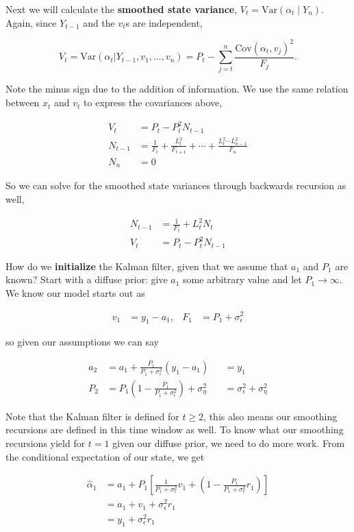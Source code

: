 \documentclass{tufte-book}
\begin{document}
Next we will calculate the \textbf{smoothed state variance}, $V_t = \text{Var}(\alpha_t \mid Y_n)$. Again, since $Y_{t-1}$ and the $v_t$s are independent, 

\[
V_t = \text{Var}(\alpha_t | Y_{t-1}, v_1, ..., v_n) = P_t - \sum_{j=t}^n \frac{\text{Cov}(\alpha_t, v_j)^2}{F_j}.
\]

\noindent Note the minus sign due to the addition of information. We use the same relation between $x_t$ and $v_t$ to express the covariances above,

\begin{align*}
V_t &= P_t - P_t^2 N_{t-1} \\
N_{t-1} &= \frac{1}{F_t} + \frac{L_t^2}{F_{t+1}} + \cdots + \frac{L_t^2 \cdots L_{n-1}^2}{F_n} \\
N_n &= 0
\end{align*}

So we can solve for the smoothed state variances through backwards recursion as well,

\begin{align*}
N_{t-1} &= \frac{1}{F_t} + L_t^2 N_t \\
V_t &= P_t - P_t^2 N_{t-1} 
\end{align*}

How do we \textbf{initialize} the Kalman filter, given that we assume that $a_1$ and $P_1$ are known? Start with a diffuse prior: give $a_1$ some arbitrary value and let $P_1 \rightarrow \infty$. We know our model starts out as

\begin{align*}
v_1 &= y_1 - a_1, & F_1 &=P_1 + \sigma_\epsilon^2
\end{align*}

\noindent so given our assumptions we can say

\begin{align*}
a_2 &= a_1 + \frac{P_1}{P_1 + \sigma_\epsilon^2}(y_1 - a_1) &&= y_1 \\
P_2 &= P_1 \left( 1 - \frac{P_1}{P_1 + \sigma_\epsilon^2}\right) + \sigma_\eta^2 &&= \sigma_\epsilon^2 + \sigma_\eta^2
\end{align*}

Note that the Kalman filter is defined for $t \geq 2$, this also means our smoothing recursions are defined in this time window as well. To know what our smoothing recursions yield for $t=1$ given our diffuse prior, we need to do more work. From the conditional expectation of our state, we get

\begin{align*}
\hat{\alpha}_1 &= a_1 + P_1 \left[ \frac{1}{P_1 + \sigma_\epsilon^2} v_1 + \left( 1 - \frac{P_1}{P_1 + \sigma_\epsilon^2} r_1 \right) \right] \\
&= a_1 + v_1 + \sigma_\epsilon^2 r_1 \\
&= y_1 + \sigma_\epsilon^2 r_1
\end{align*}
\end{document}
